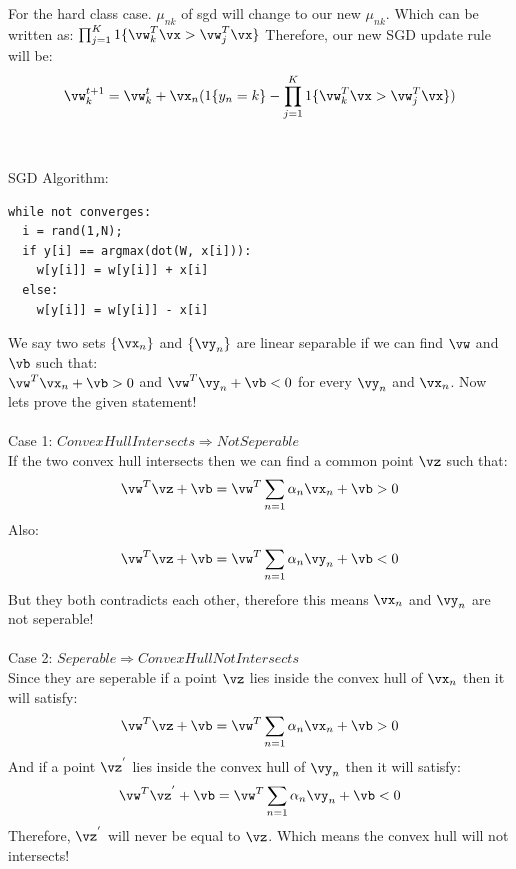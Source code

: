 \documentclass[a4paper,11pt]{article}
\begin{document}
\begin{mlsolution}
\begin{lstlisting}
\end{lstlisting}
\\
\\
\\For the hard class case. $\mu_{nk}$ of sgd will change to our new $\mu_{nk}$. Which can be written as: $\prod_{j=1}^{K} 1\{\vw_{k}^{T}\vx > \vw_{j}^{T}\vx\}$
Therefore, our new SGD update rule will be:
\begin{equation}
   \vw_{k}^{t+1} = \vw_{k}^{t} + \vx_{n}(1\{y_{n}=k\} - \prod_{j=1}^{K} 1\{\vw_{k}^{T}\vx > \vw_{j}^{T}\vx\})
\end{equation}
\\
\\SGD Algorithm:
\begin{lstlisting}
while not converges:
  i = rand(1,N);
  if y[i] == argmax(dot(W, x[i])):
    w[y[i]] = w[y[i]] + x[i]
  else:
    w[y[i]] = w[y[i]] - x[i]
\end{lstlisting}

\end{mlsolution}


\begin{mlsolution}

\noindent We say two sets $\{\vx_{n}\}$ and $\{\vy_{n}\}$ are linear separable if we can find $\vw$ and $\vb$ such that: \\$\vw^{T}\vx_{n} + \vb > 0$ and $\vw^{T}\vy_{n} + \vb < 0$ for every $\vy_{n}$ and $\vx_{n}$. Now lets prove the given statement!
\\
\\Case 1: $Convex Hull Intersects \Rightarrow Not Seperable$
\\If the two convex hull intersects then we can find a common point $\vz$ such that:
\begin{equation}
  \vw^{T}\vz + \vb = \vw^{T}\sum_{n=1}\alpha_{n}\vx_{n} + \vb > 0
\end{equation}
Also:
\begin{equation}
  \vw^{T}\vz + \vb = \vw^{T}\sum_{n=1}\alpha_{n}\vy_{n} + \vb < 0
\end{equation}
But they both contradicts each other, therefore this means $\vx_{n}$ and ${\vy_{n}}$ are not seperable!
\\
\\Case 2: $Seperable \Rightarrow Convex Hull Not Intersects$
\\Since they are seperable if a point $\vz$ lies inside the convex hull of $\vx_{n}$ then it will satisfy:
\begin{equation}
  \vw^{T}\vz + \vb = \vw^{T}\sum_{n=1}\alpha_{n}\vx_{n} + \vb > 0
\end{equation}
And if a point $\vz^{'}$ lies inside the convex hull of $\vy_{n}$ then it will satisfy:
\begin{equation}
  \vw^{T}\vz^{'} + \vb = \vw^{T}\sum_{n=1}\alpha_{n}\vy_{n} + \vb < 0
\end{equation}
Therefore, $\vz^{'}$ will never be equal to $\vz$. Which means the convex hull will not intersects!

\end{mlsolution}
\end{document}
